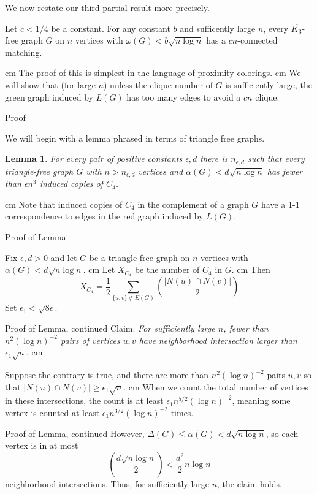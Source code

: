 \documentclass{beamer}
\newtheorem{lem}{Lemma}
\newcommand{\blem}[1]{\begin{lem}#1\end{lem}}
\newcommand{\bframe}[2]{\begin{frame}{#1}#2\end{frame}}
\begin{document}
\bframe{}{

We now restate our third partial result more precisely. \pause
\begin{theorem}
Let $c < 1/4$ be a constant.  For any constant $b$ and sufficently large $n$, every $\overline{K_3}$-free graph $G$ on $n$ vertices with $\omega(G) < b\sqrt{n\log n}$ has a $cn$-connected matching.
\label{sm_cli}
\end{theorem}
\pause\vskip 0.25 cm
The proof of this is simplest in the language of proximity colorings.  \pause\vskip 0.5 cm
We will show that (for large $n$) unless the clique number of $G$ is sufficiently large, the green graph induced by $L(G)$ has too many edges to avoid a $cn$ clique. 
}

\bframe{Proof}{

We will begin with a lemma phrased in terms of triangle free graphs.\pause
\blem{For every pair of positive constants $\epsilon, d$ there is $n_{\epsilon, d}$ such that every triangle-free graph $G$ with $n > n_{\epsilon, d}$ vertices and $\alpha(G) < d\sqrt{n\log n}$ has fewer than $\epsilon n^3$ induced copies of $C_4$.}\pause \vskip 0.5 cm
Note that induced copies of $C_4$ in the complement of a graph $G$ have a 1-1 correspondence to edges in the red graph induced by $L(G)$.
}

\bframe{Proof of Lemma}{

Fix $\epsilon, d> 0$ and let $G$ be a triangle free graph on $n$ vertices with $\alpha(G) < d\sqrt{n\log n}$. \pause \vskip 0.5 cm
Let $X_{C_4}$ be the number of $C_4$ in $G$. \pause \vskip 0.5 cm 
Then
\[X_{C_4} = \frac{1}{2}\sum_{\{u,v\}\notin E(G)} {|N(u) \cap N(v)| \choose 2}\]\pause
Set $\epsilon_1 < \sqrt{8\epsilon}$.
}

\bframe{Proof of Lemma, continued}{
\noindent Claim. \textit{For sufficiently large $n$, fewer than $n^2(\log n)^{-2}$ pairs of vertices $u,v$ have neighborhood intersection larger than $\epsilon_1\sqrt{n}$.}\pause \vskip 0.5 cm

Suppose the contrary is true, and there are more than $n^2(\log n)^{-2}$ pairs $u,v$ so that $|N(u)\cap N(v)| \geq \epsilon_1\sqrt{n}$. \pause \vskip 0.5 cm
When we count the total number of vertices in these intersections, the count is at least $\epsilon_1n^{5/2}(\log n)^{-2}$, meaning some vertex is counted at least $\epsilon_1n^{3/2}(\log n)^{-2}$ times. 
}

\bframe{Proof of Lemma, continued} {
However, $\Delta(G) \leq \alpha(G) < d\sqrt{n\log n}$, so each vertex is in at most \[{d\sqrt{n\log n}\choose 2 } < \frac{d^2}{2}n\log n\] neighborhood intersections.  Thus, for sufficiently large $n$,  the claim holds.
}
\end{document}
